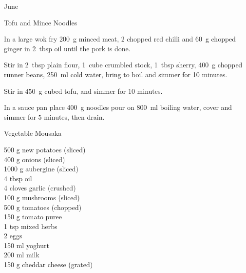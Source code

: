 \begin{menu}{June}
\begin{recipe}{2}{Tofu and Mince Noodles}
    \begin{instructions}
    \item 
        In a large wok fry
        200~g  minced meat,
        2 chopped red chilli
        and
        60~g chopped ginger
        in
        2~tbsp  oil
        until the pork is done.
      \item 
        Stir in
        2~tbsp  plain flour,
        1~cube crumbled stock,
        1~tbsp  sherry,
        400~g chopped runner beans,
        250~ml  cold water,
        bring to boil
        and
        simmer for 10 minutes.
      \item 
        Stir in
        450~g cubed tofu,
        and
        simmer for 10 minutes.
      \item 
    In a
    sauce pan
    place
    400~g  noodles
    pour on
    800~ml  boiling water,
    cover and simmer for 5 minutes, then drain.
  
    \end{instructions}
    \end{recipe}%
  
    \begin{recipe}{2}{Vegetable Mousaka}%
		\begin{ingredients}
		500 g new potatoes (sliced) \\
	400 g onions (sliced) \\
	1000 g aubergine (sliced) \\
	4 tbsp oil  \\
	4 cloves garlic (crushed) \\
	100 g mushrooms (sliced) \\
	500  g tomatoes (chopped) \\
	150 g tomato puree  \\
	1 tsp mixed herbs  \\
	2  eggs  \\
	150 ml yoghurt  \\
	200 ml milk  \\
	150 g cheddar cheese (grated) \\
	
		\end{ingredients}
	
	

\end{recipe}
\end{menu}
